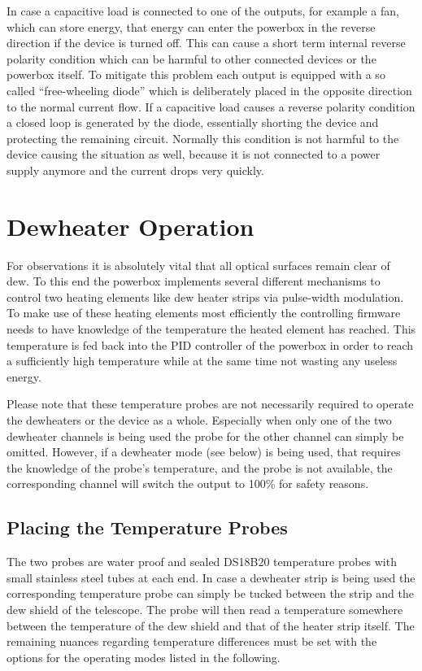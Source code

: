 \documentclass{scrartcl}
\begin{document}
In case a capacitive load is connected to one of the outputs, for example a fan,
which can store energy, that energy can enter the powerbox in the reverse
direction if the device is turned off. This can cause a short term internal
reverse polarity condition which can be harmful to other connected devices or the
powerbox itself. To mitigate this problem each output is equipped with a so
called ``free-wheeling diode'' which is deliberately placed in the opposite
direction to the normal current flow. If a capacitive load causes a reverse
polarity condition a closed loop is generated by the diode, essentially shorting
the device and protecting the remaining circuit. Normally this condition is not
harmful to the device causing the situation as well, because it is not connected
to a power supply anymore and the current drops very quickly.

\section{Dewheater Operation}
\label{sec:dewheater}
For observations it is absolutely vital that all optical surfaces remain clear
of dew. To this end the powerbox implements several different mechanisms to
control two heating elements like dew heater strips via pulse-width modulation.
To make use of these heating elements most efficiently the controlling firmware
needs to have knowledge of the temperature the heated element has reached. This
temperature is fed back into the PID controller of the powerbox in order to
reach a sufficiently high temperature while at the same time not wasting any
useless energy.

Please note that these temperature probes are not necessarily required to
operate the dewheaters or the device as a whole. Especially when only one of the
two dewheater channels is being used the probe for the other channel can simply
be omitted. However, if a dewheater mode (see below) is being used, that
requires the knowledge of the probe's temperature, and the probe is not
available, the corresponding channel will switch the output to 100\% for safety
reasons.

\subsection{Placing the Temperature Probes}
The two probes are water proof and sealed DS18B20 temperature probes with small
stainless steel tubes at each end. In case a dewheater strip is being used the
corresponding temperature probe can simply be tucked between the strip and the
dew shield of the telescope. The probe will then read a temperature
somewhere between the temperature of the dew shield and that of the heater strip
itself. The remaining nuances regarding temperature differences must be set with
the options for the operating modes listed in the following.
\end{document}
